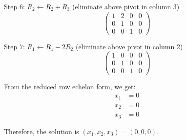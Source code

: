 Step 6: $R_2 \leftarrow R_2 + R_3$ (eliminate above pivot in column 3)
\[
\left(\begin{array}{ccc|c}
1 & 2 & 0 & 0\\
0 & 1 & 0 & 0\\
0 & 0 & 1 & 0
\end{array}\right)
\]

Step 7: $R_1 \leftarrow R_1 - 2R_2$ (eliminate above pivot in column 2)
\[
\left(\begin{array}{ccc|c}
1 & 0 & 0 & 0\\
0 & 1 & 0 & 0\\
0 & 0 & 1 & 0
\end{array}\right)
\]

From the reduced row echelon form, we get:
\begin{align*}
x_1 &= 0\\
x_2 &= 0\\
x_3 &= 0
\end{align*}

Therefore, the solution is $\boxed{(x_1, x_2, x_3) = (0, 0, 0)}$.